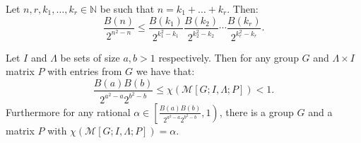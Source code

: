 \documentclass[10pt,a4paper]{amsart}
\newcommand{\N}{\mathbb{N}}
\newcommand{\RM}{\mathcal{M}[G;I,\Lambda;P]}
\begin{document}
\begin{lemma}
    \label{Bell number inequality}
    Let $n , r , k_1 , \dots , k_r \in \N$ be such that $n = k_1 + \dots + k_r$.
    Then:
    \begin{equation*}
        \frac{B(n)}{2^{n^2 - n}} \leq \frac{B(k_1)}{2^{k_1^2 - k_1}} \frac{B(k_2)}{2^{k_2^2 - k_2}} \cdots \frac{B(k_r)}{2^{k_r^2 - k_r}}.
    \end{equation*}
\end{lemma}

\begin{thm}
    \label{main theorem section 3}
    Let $I$ and $\Lambda$ be sets of size $a,b>1$ respectively.
    Then for any group $G$ and $\Lambda \times I$ matrix $P$ with entries from $G$ we have that:
    \begin{equation*}
        \frac{B(a)B(b)}{2^{a^2 - a}2^{b^2-b}} \leq \chi(\RM) < 1.
    \end{equation*}
    Furthermore for any rational $\alpha \in \left[ \frac{B(a)B(b)}{2^{a^2 - a}2^{b^2-b}} , 1\right)$, there is a group $G$ and a matrix $P$ with $\chi(\RM) = \alpha$.
\end{thm}
\end{document}
